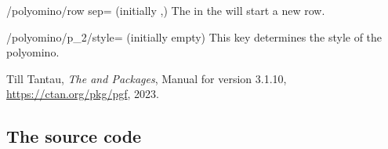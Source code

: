 \documentclass[a4paper,english,dvipsnames]{ltxdoc}
\begin{document}
\begin{key}{/polyomino/row sep= (initially ,)}
The  in the  will start a new row.
\end{key}
\begin{stylekey}{/polyomino/p\_2/style= (initially \normalfont empty)}
This key determines the style of the polyomino.
\end{stylekey}
\begin{thebibliography}{9}
Till Tantau,
\emph{The \tikzname{} and {\upshape\pgfname} Packages},
Manual for version 3.1.10,
\url{https://ctan.org/pkg/pgf},
2023.
\end{thebibliography}
\printindex
{}
\pagestyle{plain}
\appendix
\begin{landscape}
\section{The source code}\label{Thesourcecode}
\end{landscape}
\end{document}
